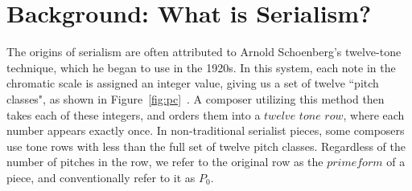 \section{Background: What is Serialism?}

The origins of serialism are often attributed to Arnold Schoenberg's twelve-tone technique, which
he began to use in the 1920s. In this system, each note in the chromatic scale 
is assigned an integer value, giving us a set of twelve ``pitch classes", as shown in 
Figure~\ref{fig:pc}~\cite{appleby2013accidentals}.
A composer utilizing this method then takes each of these integers, and orders 
them into a $twelve$ $tone$ $row$, where each number appears exactly once. In non-traditional
serialist pieces, some composers use tone rows with less than the full set of twelve pitch classes.
Regardless of the number of pitches in the row, we refer to the original row as the $prime form$ 
of a piece, and conventionally refer to it as $P_0$. 


